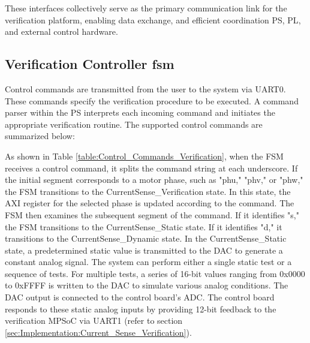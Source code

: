 These interfaces collectively serve as the primary communication link for the verification platform, enabling data exchange, and efficient coordination \acs{PS}, \acs{PL}, and external control hardware.

\subsection{Verification Controller fsm}
\label{sec:Implementation:Verification_Controller_fsm}

Control commands are transmitted from the user to the system via UART0. These commands specify the verification procedure to be executed. A command parser within the \acs{PS} interprets each incoming command and initiates the appropriate verification routine. The supported control commands are summarized below:

As shown in Table \ref{table:Control_Commands_Verification}, when the \acs{FSM} receives a control command, it splits the command string at each underscore. If the initial segment corresponds to a motor phase, such as "phu," "phv," or "phw," the \acs{FSM} transitions to the CurrentSense\_Verification state. In this state, the \acs{AXI} register for the selected phase is updated according to the command. The \acs{FSM} then examines the subsequent segment of the command. If it identifies "s," the \acs{FSM} transitions to the CurrentSense\_Static state. If it identifies "d," it transitions to the CurrentSense\_Dynamic state. In the CurrentSense\_Static state, a predetermined static value is transmitted to the \acs{DAC} to generate a constant analog signal. The system can perform either a single static test or a sequence of tests. For multiple tests, a series of 16-bit values ranging from 0x0000 to 0xFFFF is written to the \acs{DAC} to simulate various analog conditions. The \acs{DAC} output is connected to the control board's \acs{ADC}. The control board responds to these static analog inputs by providing 12-bit feedback to the verification \acs{MPSoC} via UART1 (refer to section \ref{sec:Implementation:Current_Sense_Verification}).

